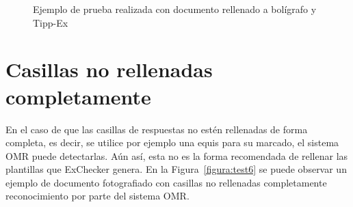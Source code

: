\documentclass[a4paper, 12pt]{book}
\begin{document}
\begin{figure}
  \centering
  \caption{Ejemplo de prueba realizada con documento rellenado a bolígrafo y Tipp-Ex}
  \label{figura:test5}
\end{figure}

\section{Casillas no rellenadas completamente}
\label{sec:casillas_con_cruz}

En el caso de que las casillas de respuestas no estén rellenadas de forma
completa, es decir, se utilice por ejemplo una equis para su marcado, el
sistema OMR puede detectarlas. Aún así, esta no es la forma recomendada
de rellenar las plantillas que ExChecker genera.
En la Figura~\ref{figura:test6} se puede observar un ejemplo
de documento fotografiado con casillas no rellenadas completamente
reconocimiento por parte
del sistema OMR.
\end{document}
